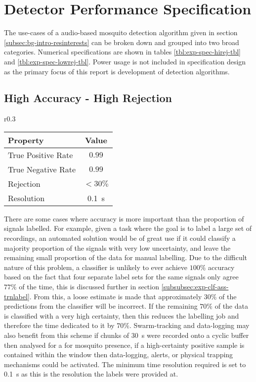 \section{Detector Performance Specification}
\label{sec:exp-spec}
    The use-cases of a audio-based mosquito detection algorithm given in section \ref{subsec:bg-intro-resinterests} can be broken down and grouped into two broad categories. Numerical specifications are shown in tables \ref{tbl:exp-spec-hirej-tbl} and \ref{tbl:exp-spec-lowrej-tbl}. Power usage is not included in specification design as the primary focus of this report is development of detection algorithms. 
    \subsection{High Accuracy - High Rejection}
    \label{subsec:exp-spec-hirej}
        \begin{wraptable}{r}{0.3\textwidth}
            \scriptsize
            \singlespacing
            \centering
                \begin{tabular}{ |l||c| } 
                    \hline
                    Property & Value \\ 
                    \hline
                    \hline
                    True Positive Rate & $0.99$ \\
                    True Negative Rate & $0.99$ \\
                    Rejection & $<30\%$\\
                    Resolution & \SI{0.1}{\second}\\
                    \hline
                \end{tabular}
            \caption{High accuracy - high rejection specifications.}
            \label{tbl:exp-spec-hirej-tbl}
        \end{wraptable}
        There are some cases where accuracy is more important than the proportion of signals labelled. For example, given a task where the goal is to label a large set of recordings, an automated solution would be of great use if it could classify a majority proportion of the signals with very low uncertainty, and leave the remaining small proportion of the data for manual labelling. Due to the difficult nature of this problem, a classifier is unlikely to ever achieve $100\%$ accuracy based on the fact that four separate label sets for the same signals only agree $77\%$ of the time, this is discussed further in section \ref{subsubsec:exp-clf-ass-trnlabel}. From this, a loose estimate is made that approximately $30\%$ of the predictions from the classifier will be incorrect. If the remaining $70\%$ of the data is classified with a very high certainty, then this reduces the labelling job and therefore the time dedicated to it by $70\%$. Swarm-tracking and data-logging may also benefit from this scheme if chunks of \SI{30}{\second} were recorded onto a cyclic buffer then analysed for a for mosquito presence, if a high-certainty positive sample is contained within the window then data-logging, alerts, or physical trapping mechanisms could be activated. The minimum time resolution required is set to \SI{0.1}{\second} as this is the resolution the labels were provided at.  
        

